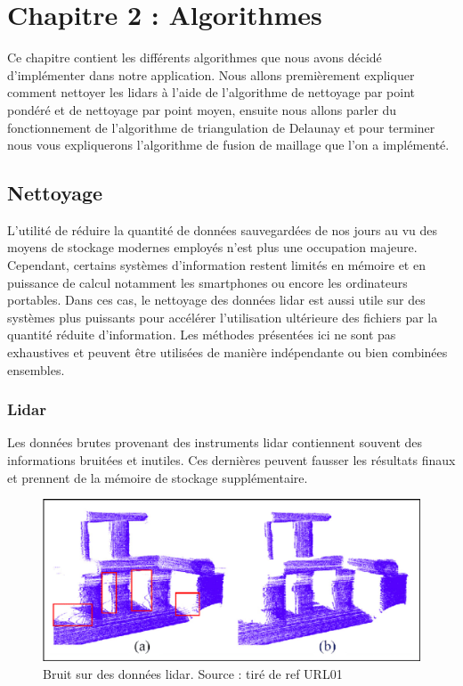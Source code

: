 \chapter{Chapitre 2 : Algorithmes}

Ce chapitre contient les différents algorithmes que nous avons décidé d'implémenter dans notre application.
Nous allons premièrement expliquer comment nettoyer les lidars à l'aide de
l'algorithme de nettoyage par point pondéré et de nettoyage par point moyen,
ensuite nous allons parler du fonctionnement de l'algorithme de triangulation de 
Delaunay et pour terminer nous vous expliquerons l'algorithme de fusion de 
maillage que l'on a implémenté.

\section{Nettoyage}

L'utilité de réduire la quantité de données sauvegardées de nos jours au vu des 
moyens de stockage modernes employés n'est plus une occupation majeure.
Cependant, certains systèmes d'information restent limités en mémoire et en
puissance de calcul notamment les smartphones ou encore les ordinateurs portables.
Dans ces cas, 
le nettoyage des données \gls{lidar} est aussi utile sur des systèmes plus puissants
pour accélérer l'utilisation ultérieure des fichiers par la quantité réduite
d'information.
Les méthodes présentées ici ne sont pas exhaustives et peuvent être utilisées
de manière indépendante ou bien combinées ensembles.

\subsection{Lidar}

Les données brutes provenant des instruments \gls{lidar} contiennent souvent
des informations bruitées et inutiles.
Ces dernières peuvent fausser les résultats finaux et prennent de la mémoire
de stockage supplémentaire.

\begin{figure}[htbp!]
    \centering
    \includegraphics[width=0.8\linewidth]{figures/lidar noise.png}
    \caption{Bruit sur des données lidar. Source : tiré de ref URL01}
	\label{fig:lidar_noise}
\end{figure}

